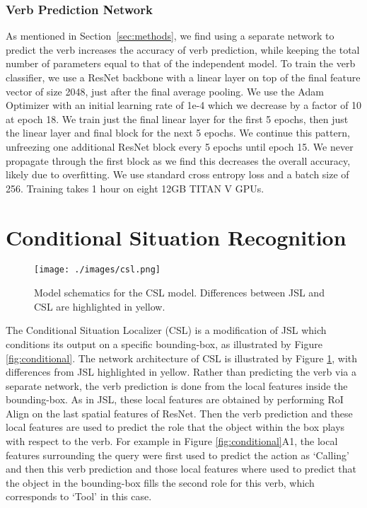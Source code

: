 \documentclass[runningheads]{llncs}
\begin{document}
\subsubsection{Verb Prediction Network}
As mentioned in Section~\ref{sec:methods}, we find using a separate network to predict the verb increases the accuracy of verb prediction, while keeping the total number of parameters equal to that of the independent model. To train the verb classifier, we use a ResNet backbone with a linear layer on top of the final feature vector of size 2048, just after the final average pooling. We use the Adam Optimizer with an initial learning rate of 1e-4 which we decrease by a factor of 10 at epoch 18. We train just the final linear layer for the first 5 epochs, then just the linear layer and final block for the next 5 epochs. We continue this pattern, unfreezing one additional ResNet block every 5 epochs until epoch 15. We never propagate through the first block as we find this decreases the overall accuracy, likely due to overfitting. We use standard cross entropy loss and a batch size of 256. Training takes 1 hour on eight 12GB TITAN V GPUs. 
 \section{Conditional Situation Recognition}
\label{sec:csl}


\begin{figure}
\centering
\texttt{[image: ./images/csl.png]}
\caption{Model schematics for the CSL model. Differences between JSL and CSL are highlighted in yellow.
}

\label{fig:csl}
\end{figure}


The Conditional Situation Localizer (CSL) is a modification of JSL which conditions its output on a specific bounding-box, as illustrated by Figure \ref{fig:conditional}. The network architecture of CSL is illustrated by Figure \ref{fig:csl}, with differences from JSL highlighted in yellow. Rather than predicting the verb via a separate network, the verb prediction is done from the local features inside the bounding-box. As in JSL, these local features are obtained by performing RoI Align on the last spatial features of ResNet. Then the verb prediction and these local features are used to predict the role that the object within the box plays with respect to the verb. For example in Figure \ref{fig:conditional}A1, the local features surrounding the query were first used to predict the action as `Calling' and then this verb prediction and those local features where used to predict that the object in the bounding-box fills the second role for this verb, which corresponds to `Tool' in this case. 
\end{document}
